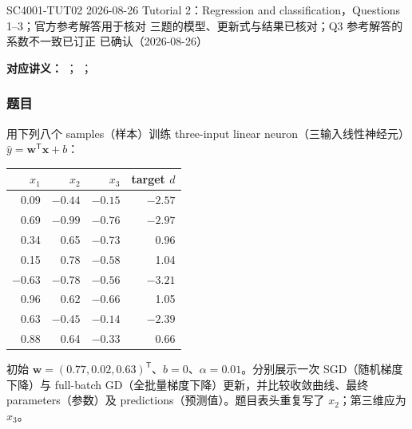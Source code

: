 
\label{tutorial:SC4001-TUT02}

\tutorialmeta
  {SC4001-TUT02}
  {2026-08-26}
  {Tutorial 2：Regression and classification，Questions 1--3；官方参考解答用于核对}
  {三题的模型、更新式与结果已核对；Q3 参考解答的系数不一致已订正}
  {已确认（2026-08-26）}


\textbf{对应讲义：}
；
；

\subsubsection*{题目}

用下列八个 samples（样本）训练 three-input linear neuron（三输入线性神经元）$\hat y=\bm w^{\mathsf T}\bm x+b$：
\begin{center}
\small
\begin{tabular}{@{}rrrr@{}}
  \toprule
  $x_1$ & $x_2$ & $x_3$ & target $d$ \\
  \midrule
   0.09 & $-0.44$ & $-0.15$ & $-2.57$ \\
   0.69 & $-0.99$ & $-0.76$ & $-2.97$ \\
   0.34 &  0.65 & $-0.73$ &  0.96 \\
   0.15 &  0.78 & $-0.58$ &  1.04 \\
  $-0.63$ & $-0.78$ & $-0.56$ & $-3.21$ \\
   0.96 &  0.62 & $-0.66$ &  1.05 \\
   0.63 & $-0.45$ & $-0.14$ & $-2.39$ \\
   0.88 &  0.64 & $-0.33$ &  0.66 \\
  \bottomrule
\end{tabular}
\end{center}
初始 $\bm w=(0.77,0.02,0.63)^{\mathsf T}$、$b=0$、$\alpha=0.01$。分别展示一次 SGD（随机梯度下降）与 full-batch GD（全批量梯度下降）更新，并比较收敛曲线、最终 parameters（参数）及 predictions（预测值）。题目表头重复写了 $x_2$；第三维应为 $x_3$。

